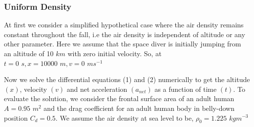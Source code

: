 \documentclass[a4paper, 14pt]{extarticle}
\begin{document}
\subsubsection {Uniform Density}
At first we consider a simplified hypothetical case where the air density remains constant throughout the fall, i.e the air density is independent of altitude or any other parameter. Here we assume that the space diver is initially jumping from an altitude of 10 $km$ with zero initial velocity. So, at $t=\text{0 }s, x=\text{10000 }m, v=\text{0 } ms^{-1}$

Now we solve the differential equations (1) and (2) numerically to get the altitude $(x)$, velocity $(v)$ and net acceleration $(a_{net})$ as a function of time $(t)$. To evaluate the solution, we consider the frontal surface area of an adult human $A = \text{0.95 }m^2$ and the drag coefficient for an adult human body in belly-down position $C_d = 0.5$. We assume the air density at sea level to be, $\rho_0=\text{1.225 }kgm^{-3}$
\end{document}
